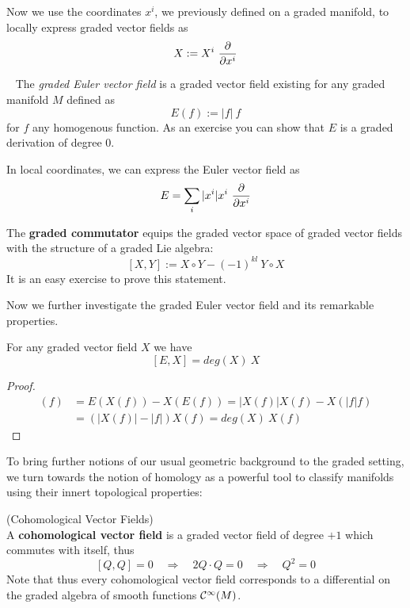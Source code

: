 Now we use the coordinates $x^i$, we previously defined on a graded manifold, to locally express graded vector fields as
$$ X := X^i \ \dell{}{x^i} $$

\begin{example}~
  The \emph{graded Euler vector field} is a graded vector field existing for any graded manifold $M$ defined as
  $$ E(f) := |f| \ f $$
  for $f$ any homogenous function. As an exercise you can show that $E$ is a graded derivation of degree $0$.
\end{example}

In local coordinates, we can express the Euler vector field as
$$ E = \sum_i |x^i| x^i \ \frac{\partial }{\partial x^i} $$

\begin{rem}
  The \textbf{graded commutator} equips the graded vector space of graded vector fields with the structure of a graded Lie algebra:
  $$ [X,Y] := X \circ Y - (-1)^{kl} \ Y \circ X $$
  It is an easy exercise to prove this statement.
\end{rem}

Now we further investigate the graded Euler vector field and its remarkable properties.

\begin{prop}
  For any graded vector field $X$ we have
  $$ [E,X] = deg(X) \ X $$
\begin{proof}
  \begin{align}
    [E,X](f) &= E(X(f)) - X(E(f)) = |X(f)| X(f) - X(|f| f)\\
    &= (|X(f)| - |f|) X(f) = deg(X) \ X(f)
  \end{align}
\end{proof}
\end{prop}


To bring further notions of our usual geometric background to the graded setting, we turn towards the notion of homology as a powerful tool to classify manifolds using their innert topological properties:

\begin{definition} (Cohomological Vector Fields)\\
  A \textbf{cohomological vector field} is a graded vector field of degree $+1$ which commutes with itself, thus
  $$ [Q,Q] = 0 \quad \Rightarrow \quad 2 Q\cdot Q = 0 \quad \Rightarrow \quad Q^2=0 $$
  Note that thus every cohomological vector field corresponds to a differential on the graded algebra of smooth functions $\mathcal{C}^{\infty}(M)$.
\end{definition}

